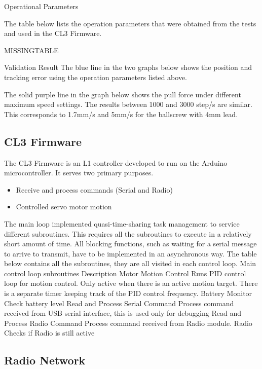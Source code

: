 Operational Parameters

The table below lists the operation parameters that were obtained from the tests and used in the CL3 Firmware.

MISSINGTABLE

Validation Result
The blue line in the two graphs below shows the position and tracking error using the operation parameters listed above.

The solid purple line in the graph below shows the pull force under different maximum speed settings. The results between 1000 and 3000 step/s are similar. This corresponds to 1.7mm/s and 5mm/s for the ballscrew with 4mm lead.

\subsection{CL3 Firmware}
\label{subsection:exploration-2-cl3-firmware}

The CL3 Firmware is an L1 controller developed to run on the Arduino microcontroller. It serves two primary purposes.

\begin{itemize}
    \item Receive and process commands (Serial and Radio)
    \item Controlled servo motor motion
\end{itemize}

The main loop implemented quasi-time-sharing task management to service different subroutines. This requires all the subroutines to execute in a relatively short amount of time. All blocking functions, such as waiting for a serial message to arrive to transmit, have to be implemented in an asynchronous way. The table below contains all the subroutines, they are all visited in each control loop.
Main control loop subroutines
Description
Motor Motion Control
Runs PID control loop for motion control. Only active when there is an active motion target. There is a separate timer keeping track of the PID control frequency.
Battery Monitor
Check battery level
Read and Process Serial Command 
Process command received from USB serial interface, this is used only for debugging
Read and Process Radio Command 
Process command received from Radio module. 
Radio
Checks if Radio is still active


\subsection{Radio Network}
\label{subsection:exploration-2-radio-network}

